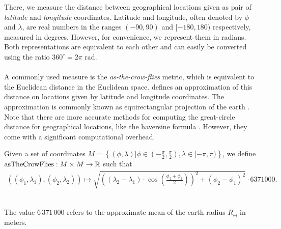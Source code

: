 	There, we measure the distance between geographical locations given as pair of \textit{latitude} and \textit{longitude} coordinates.
	Latitude and longitude, often denoted by $\phi$ and $\lambda$, are real numbers in the ranges $(-90, 90)$ and $[-180, 180)$ respectively,
	measured in degrees. However, for convenience, we represent them in radians. Both representations are equivalent to each other
	and can easily be converted using the ratio $360^\circ = 2 \pi \text{ rad}$.\\\\
	A commonly used measure is the \textit{as-the-crow-flies} metric, which is equivalent to the Euclidean distance in the Euclidean space.
	 defines an approximation of this distance on locations given by latitude and longitude coordinates.
	The approximation is commonly known as equirectangular projection of the earth .
	Note that there are more accurate methods for computing the great-circle distance for geographical locations,
	like the haversine formula . However, they come with a significant computational overhead.
	\begin{mydef}\label{asTheCrowFlies}
		Given a set of coordinates $M = \left\{(\phi, \lambda) | \phi \in \left(-\frac{\pi}{2}, \frac{\pi}{2}\right), \lambda \in [-\pi, \pi)\right\}$, we define
		$\operatorname{asTheCrowFlies}: M \times M \to \mathbb{R}$ such that
		\begin{align*}
			\left(\left(\phi_1, \lambda_1\right), \left(\phi_2, \lambda_2\right)\right) \mapsto
				\sqrt{\left(\left(\lambda_2 - \lambda_1\right) \cdot \cos\left(\frac{\phi_1 + \phi_2}{2}\right)\right)^2
					+ \left(\phi_2 - \phi_1\right)^2} \cdot 6371000.
		\end{align*}
	\end{mydef}\quad\\
	The value $6\,371\,000$ refers to the approximate mean of the earth radius $R_{\oplus}$ in meters.